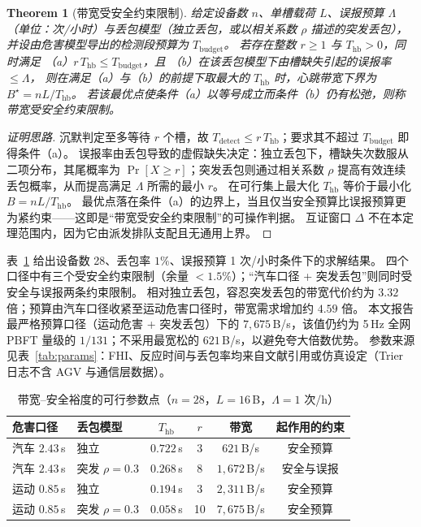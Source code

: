 \documentclass[manuscript,screen,review]{acmart}
\newtheorem{theorem}{Theorem}
\begin{document}
\begin{theorem}[带宽受安全约束限制]
\label{thm:bw}
给定设备数 $n$、单槽载荷 $L$、误报预算 $\Lambda$（单位：次/小时）与丢包模型（独立丢包，或以相关系数 $\rho$ 描述的突发丢包），
并设由危害模型导出的检测段预算为 $T_{\mathrm{budget}}$。
若存在整数 $r\ge 1$ 与 $T_{\mathrm{hb}}>0$，同时满足
（a）$r\,T_{\mathrm{hb}}\le T_{\mathrm{budget}}$，且
（b）在该丢包模型下由槽缺失引起的误报率 $\le\Lambda$，
则在满足（a）与（b）的前提下取最大的 $T_{\mathrm{hb}}$ 时，心跳带宽下界为 $B^\star=n L/T_{\mathrm{hb}}$。
若该最优点使条件（a）以等号成立而条件（b）仍有松弛，则称带宽受安全约束限制。
\end{theorem}
\begin{proof}[证明思路]
沉默判定至多等待 $r$ 个槽，故 $T_{\mathrm{detect}}\le r\,T_{\mathrm{hb}}$；要求其不超过 $T_{\mathrm{budget}}$ 即得条件（a）。
误报率由丢包导致的虚假缺失决定：独立丢包下，槽缺失次数服从二项分布，其尾概率为 $\Pr[X\ge r]$；突发丢包则通过相关系数 $\rho$ 提高有效连续丢包概率，从而提高满足 $\Lambda$ 所需的最小 $r$。
在可行集上最大化 $T_{\mathrm{hb}}$ 等价于最小化 $B=nL/T_{\mathrm{hb}}$。
最优点落在条件（a）的边界上，当且仅当安全预算比误报预算更为紧约束——这即是``带宽受安全约束限制''的可操作判据。
互证窗口 $\Delta$ 不在本定理范围内，因为它由派发排队支配且无通用上界。
\end{proof}

表~\ref{tab:budget} 给出设备数 28、丢包率 $1\%$、误报预算 1 次/小时条件下的求解结果。
四个口径中有三个受安全约束限制（余量 ${<}1.5\%$）；``汽车口径 + 突发丢包''则同时受安全与误报两条约束限制。
相对独立丢包，容忍突发丢包的带宽代价约为 $3.32$ 倍；预算由汽车口径收紧至运动危害口径时，带宽需求增加约 $4.59$ 倍。
本文报告最严格预算口径（运动危害 + 突发丢包）下的 $7{,}675$\,B/s，该值仍约为 5\,Hz 全网 PBFT 量级的 $1/131$；不采用最宽松的 $621$\,B/s，以避免夸大倍数优势。
参数来源见表~\ref{tab:params}：FHI、反应时间与丢包率均来自文献引用或仿真设定（Trier 日志不含 AGV 与通信层数据）。

\begin{table}[t]
  \centering
  \caption{带宽--安全裕度的可行参数点（$n{=}28$，$L{=}16$\,B，$\Lambda{=}1$ 次/h）}
  \label{tab:budget}
  \begin{tabular}{@{}llcccc@{}}
    \toprule
    危害口径 & 丢包模型 & $T_{\mathrm{hb}}$ & $r$ & 带宽 & 起作用的约束 \\
    \midrule
    汽车 $2.43$\,s & 独立 & $0.722$\,s & 3 & $621$\,B/s & 安全预算 \\
    汽车 $2.43$\,s & 突发 $\rho{=}0.3$ & $0.268$\,s & 8 & $1{,}672$\,B/s & 安全与误报 \\
    运动 $0.85$\,s & 独立 & $0.194$\,s & 3 & $2{,}311$\,B/s & 安全预算 \\
    运动 $0.85$\,s & 突发 $\rho{=}0.3$ & $0.058$\,s & 10 & $7{,}675$\,B/s & 安全预算 \\
    \bottomrule
  \end{tabular}
\end{table}
\end{document}
